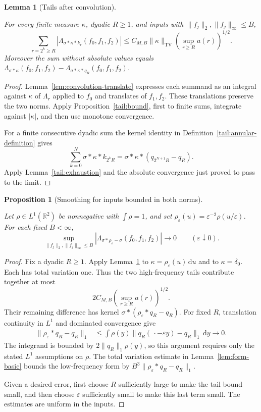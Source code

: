 \documentclass[11pt]{amsart}
\newcommand{\R}{\mathbb R}
\newcommand{\dd}{\,\mathrm d}
\newtheorem{lemma}[theorem]{Lemma}
\newtheorem{proposition}[theorem]{Proposition}
\theoremstyle{definition}
\theoremstyle{remark}
\numberwithin{equation}{section}
\providecommand{\lean}[1]{}
\providecommand{\leanok}{}
\begin{document}
\begin{lemma}[Tails after convolution]\label{tail:convolved-tail}
\lean{Auto.tail_convolved_tail,Auto.tail_convolved_tail_sum}
\leanok
For every finite measure $\kappa$, dyadic $R\ge1$, and inputs with
$\|f_j\|_2,\|f_j\|_\infty\le B$,
\[
 \sum_{r=2^k\ge R}|\Lambda_{\sigma*\kappa*k_r}(f_0,f_1,f_2)|
  \le C_{M,B}\|\kappa\|_{\mathrm{TV}}
       \left(\sup_{r\ge R}a(r)\right)^{1/2}.
\]
Moreover the sum without absolute values equals
$\Lambda_{\sigma*\kappa}(f_0,f_1,f_2)
-\Lambda_{\sigma*\kappa*q_R}(f_0,f_1,f_2)$.
\end{lemma}
\begin{proof}
Lemma~\ref{lem:convolution-translate} expresses each summand as an
integral against $\kappa$ of $\Lambda_r$ applied to $f_0$ and
translates of $f_1,f_2$. These translations preserve the two norms.
Apply Proposition~\ref{tail:bound}, first to finite sums, integrate
against $|\kappa|$, and then use monotone convergence.

For a finite consecutive dyadic sum the kernel identity in
Definition~\ref{tail:annular-definition} gives
\[
 \sum_{k=0}^{N}\sigma*\kappa*k_{2^kR}
   =\sigma*\kappa*(q_{2^{N+1}R}-q_R).
\]
Apply Lemma~\ref{tail:exhaustion} and the absolute convergence just
proved to pass to the limit.
\end{proof}

\begin{proposition}[Smoothing for inputs bounded in both norms]
\label{tail:bounded-smoothing}
\lean{Auto.tail_bounded_smoothing}
\leanok
Let $\rho\in L^1(\R^2)$ be nonnegative with $\int\rho=1$, and set
$\rho_\varepsilon(u)=\varepsilon^{-2}\rho(u/\varepsilon)$. For each
fixed $B<\infty$,
\[
 \sup_{\|f_j\|_2,\|f_j\|_\infty\le B}
 |\Lambda_{\sigma*\rho_\varepsilon-\sigma}(f_0,f_1,f_2)|
      \longrightarrow0\qquad(\varepsilon\downarrow0).
\]
\end{proposition}
\begin{proof}
Fix a dyadic $R\ge1$. Apply Lemma~\ref{tail:convolved-tail} to
$\kappa=\rho_\varepsilon(u)\dd u$ and to $\kappa=\delta_0$.
Each has total variation one. Thus the two high-frequency tails
contribute together at most
\[
 2C_{M,B}\left(\sup_{r\ge R}a(r)\right)^{1/2}.
\]
Their remaining difference has kernel
$\sigma*(\rho_\varepsilon*q_R-q_R)$. For fixed $R$, translation
continuity in $L^1$ and dominated convergence give
\begin{align*}
 \|\rho_\varepsilon*q_R-q_R\|_1
 &\le \int\rho(y)\|q_R(\,\cdot-\varepsilon y)-q_R\|_1\dd y
       \longrightarrow0.
\end{align*}
The integrand is bounded by $2\|q_R\|_1\rho(y)$, so this argument
requires only the stated $L^1$ assumptions on $\rho$. The total
variation estimate in Lemma~\ref{lem:form-basic} bounds the low-frequency
form by $B^3\|\rho_\varepsilon*q_R-q_R\|_1$.

Given a desired error, first choose $R$ sufficiently large to make the
tail bound small, and then choose $\varepsilon$ sufficiently small to
make this last term small. The estimates are uniform in the inputs.
\end{proof}
\end{document}

